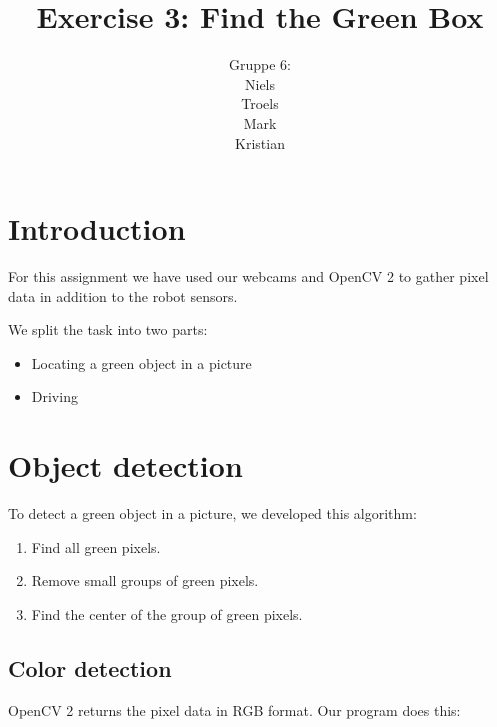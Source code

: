 \documentclass[a4paper,12pt]{article}
\title{Exercise 3: Find the Green Box}
\author{Gruppe 6:\\Niels\\Troels\\Mark\\Kristian}
\begin{document}
\maketitle

\section{Introduction}

For this assignment we have used our webcams and OpenCV 2 to gather pixel data
in addition to the robot sensors.

We split the task into two parts:

\begin{itemize}
\item Locating a green object in a picture
\item Driving
\end{itemize}


\section{Object detection}

To detect a green object in a picture, we developed this algorithm:

\begin{enumerate}
\item Find all green pixels.
\item Remove small groups of green pixels.
\item Find the center of the group of green pixels.
\end{enumerate}


\subsection{Color detection}

OpenCV 2 returns the pixel data in RGB format.  Our program does this:
\end{document}
